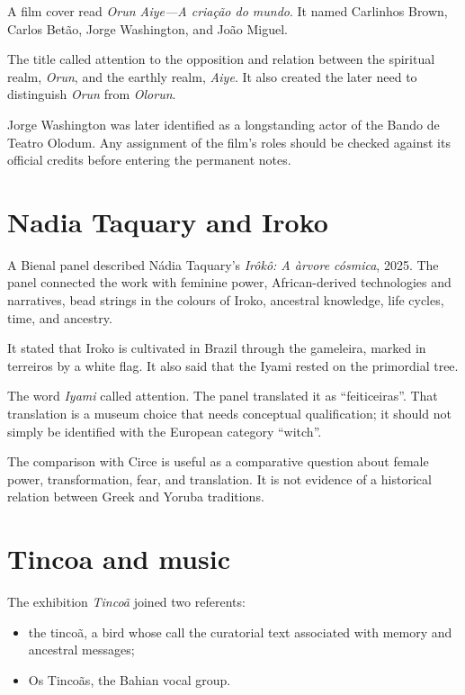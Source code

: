 A film cover read
\emph{Orun Aiye---A cria\c{c}\~ao do mundo}.
It named Carlinhos Brown, Carlos Bet\~ao,
Jorge Washington, and Jo\~ao Miguel.

The title called attention to the
opposition and relation between the
spiritual realm, \emph{Orun}, and the
earthly realm, \emph{Aiye}.  It also
created the later need to distinguish
\emph{Orun} from \emph{Olorun}.

Jorge Washington was later identified as a
longstanding actor of the Bando de Teatro
Olodum.  Any assignment of the film's roles
should be checked against its official
credits before entering the permanent
notes.

\section{Nadia Taquary and Iroko}

A Bienal panel described N\'adia Taquary's
\emph{Ir\^ok\^o: A \`arvore c\'osmica}, 2025.
The panel connected the work with feminine
power, African-derived technologies and
narratives, bead strings in the colours of
Iroko, ancestral knowledge, life cycles,
time, and ancestry.

It stated that Iroko is cultivated in
Brazil through the gameleira, marked in
terreiros by a white flag.  It also said
that the Iyami rested on the primordial
tree.

The word \emph{Iyami} called attention.
The panel translated it as
``feiticeiras''.  That translation is a
museum choice that needs conceptual
qualification; it should not simply be
identified with the European category
``witch''.

The comparison with Circe is useful as a
comparative question about female power,
transformation, fear, and translation.  It
is not evidence of a historical relation
between Greek and Yoruba traditions.

\section{Tincoa and music}

The exhibition \emph{Tinco\~a} joined two
referents:

\begin{itemize}
\item the tinco\~a, a bird whose call the
curatorial text associated with memory and
ancestral messages;
\item Os Tinco\~as, the Bahian vocal group.
\end{itemize}

